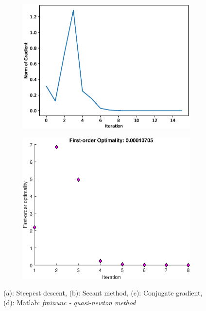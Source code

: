 \begin{figure}[h!]
\begin{subfigure}[t]{0.4\textwidth}
    \includegraphics[width=\textwidth]{images/python/cg-pB.eps}
    \caption{}
    \label{fig:TSNE}
\end{subfigure}
\hfill
\begin{subfigure}[t]{0.4\textwidth}
\centering
    \includegraphics[width=\textwidth]{images/matlab/1c_loss.eps}  
    \caption{}
    \label{fig:TSNE}
\end{subfigure}
\caption{(a): Steepest descent, (b): Secant method, (c): Conjugate gradient, (d): Matlab: \textit{fminunc - quasi-newton method}}
\end{figure}
